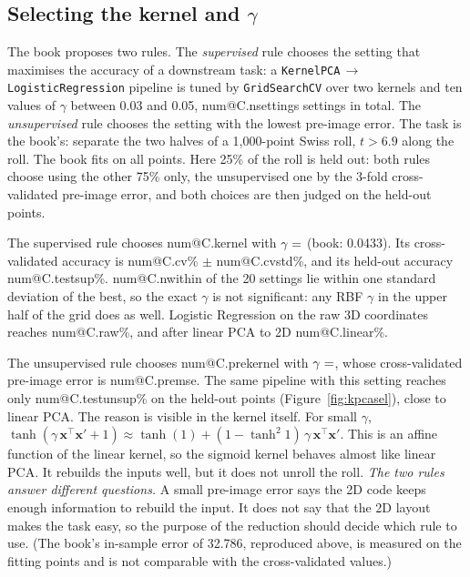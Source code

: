 \documentclass[11pt,a4paper]{article}
\makeatletter
\newcommand{\R}[1]{\csname num@#1\endcsname}
\newcommand{\x}{\mathbf{x}}
\newcommand{\T}{^{\top}}
\makeatother
\begin{document}
\subsection{Selecting the kernel and \texorpdfstring{$\gamma$}{gamma}}

The book proposes two rules. The \emph{supervised} rule chooses the setting that maximises the accuracy of a downstream task: a \texttt{KernelPCA}\,$\to$\,\texttt{LogisticRegression} pipeline is tuned by \texttt{GridSearchCV} over two kernels and ten values of $\gamma$ between 0.03 and 0.05, \R{C.nsettings} settings in total. The \emph{unsupervised} rule chooses the setting with the lowest pre-image error. The task is the book's: separate the two halves of a 1{,}000-point Swiss roll, $t>6.9$ along the roll. The book fits on all points. Here 25\% of the roll is held out: both rules choose using the other 75\% only, the unsupervised one by the 3-fold cross-validated pre-image error, and both choices are then judged on the held-out points.

The supervised rule chooses \R{C.kernel} with $\gamma=\R{C.gamma}$ (book: 0.0433). Its cross-validated accuracy is \R{C.cv}\% $\pm$ \R{C.cvstd}\%, and its held-out accuracy \R{C.testsup}\%. \R{C.nwithin} of the 20 settings lie within one standard deviation of the best, so the exact $\gamma$ is not significant: any RBF $\gamma$ in the upper half of the grid does as well. Logistic Regression on the raw 3D coordinates reaches \R{C.raw}\%, and after linear PCA to 2D \R{C.linear}\%.

The unsupervised rule chooses \R{C.prekernel} with $\gamma=\R{C.pregamma}$, whose cross-validated pre-image error is \R{C.premse}. The same pipeline with this setting reaches only \R{C.testunsup}\% on the held-out points (Figure~\ref{fig:kpcasel}), close to linear PCA. The reason is visible in the kernel itself. For small $\gamma$, $\tanh(\gamma\,\x\T\x'+1)\approx\tanh(1)+(1-\tanh^2 1)\,\gamma\,\x\T\x'$. This is an affine function of the linear kernel, so the sigmoid kernel behaves almost like linear PCA. It rebuilds the inputs well, but it does not unroll the roll. \emph{The two rules answer different questions.} A small pre-image error says the 2D code keeps enough information to rebuild the input. It does not say that the 2D layout makes the task easy, so the purpose of the reduction should decide which rule to use. (The book's in-sample error of 32.786, reproduced above, is measured on the fitting points and is not comparable with the cross-validated values.)
\end{document}
